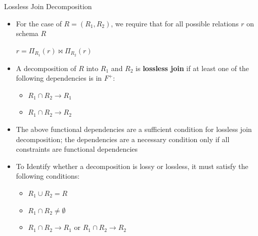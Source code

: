 \documentclass[aspectratio=169, xcolor=dvipsnames]{beamer}
\begin{document}
\begin{frame}{Lossless Join Decomposition}
    \begin{itemize}[<+->]
        \item For the case of $R = (R_1, R_2)$, we require that for all possible relations $r$ on schema $R$
        \begin{center}
            $r = \Pi_{R_1}(r) \bowtie \Pi_{R_2}(r)$
        \end{center}
        \item A decomposition of $R$ into $R_1$ and $R_2$ is \textbf{lossless join} if at least one of the following dependencies is in $F^+$:
        \begin{itemize}
            \item[$\triangleright$] $R_1 \cap R_2 \rightarrow R_1$
            \item[$\triangleright$] $R_1 \cap R_2 \rightarrow R_2$
        \end{itemize}
        \item The above functional dependencies are a sufficient condition for lossless join decomposition; the dependencies are a necessary condition only if all constraints are functional dependencies
        \item To Identify whether a decomposition is lossy or lossless, it must satisfy the following conditions:
        \begin{itemize}
            \item[$\triangleright$] $R_1 \cup R_2 = R$
            \item[$\triangleright$] $R_1 \cap R_2 \neq \emptyset$
            \item[$\triangleright$] $R_1 \cap R_2 \rightarrow R_1$ or $R_1 \cap R_2 \rightarrow R_2$
        \end{itemize}
    \end{itemize}
\end{frame}
\end{document}
